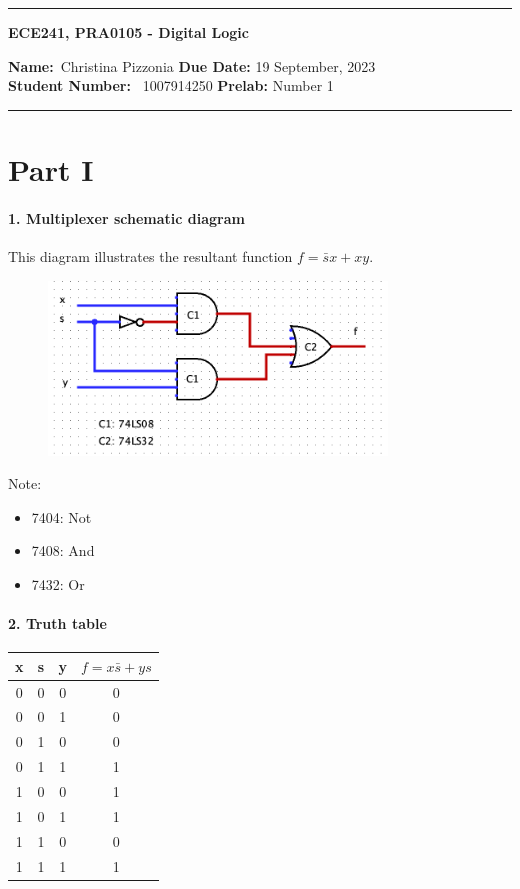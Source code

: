 \documentclass[12pt, tikz]{scrartcl}
\begin{document}
\begin{center}
	\hrule
	\vspace{.4cm}
	{\textbf { \large ECE241, PRA0105 - Digital Logic}}
\end{center}
{\textbf{Name:}\ Christina Pizzonia \hspace{\fill} \textbf{Due Date:}  19 September, 2023}   \\
{ \textbf{Student Number:}} \ 1007914250 \hspace{\fill} \textbf{Prelab:} Number 1 \\
	\hrule
\usetikzlibrary{intersections, angles, quotes} %

\section*{Part I}
\paragraph*{1. Multiplexer schematic diagram} \hfill \newline
This diagram illustrates the resultant function $ f = \bar s x + xy$. 
\begin{figure}[hp]
\begin{center}
\includegraphics[width=9cm]{q1.png}
\end{center}
\end{figure}
Note: 
\begin{itemize}
	\item 7404: Not
	\item 7408: And
	\item 7432: Or
\end{itemize}
\paragraph*{2. Truth table} \hfill \newline
\begin{table}[h]
	\centering
	\begin{tabular}{|c|c|c||c|}
	\hline
	x & s & y & $f = x\bar s + ys$ \\ \hline
	0 & 0 & 0 & 0 \\ \hline
	0 & 0 & 1 & 0 \\ \hline
	0 & 1 & 0 & 0 \\ \hline
	0 & 1 & 1 & 1 \\ \hline
	1 & 0 & 0 & 1 \\ \hline
	1 & 0 & 1 & 1 \\ \hline
	1 & 1 & 0 & 0 \\ \hline
	1 & 1 & 1 & 1 \\ \hline
	\end{tabular}
	\end{table}
\end{document}
